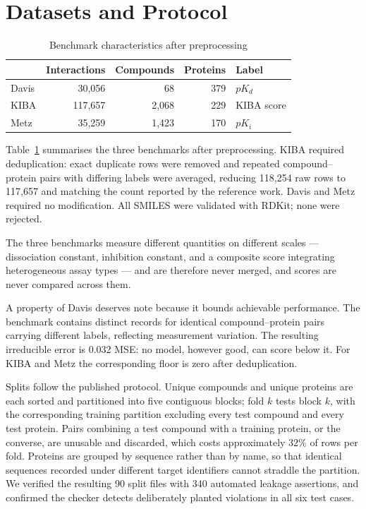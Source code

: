 \documentclass[conference]{IEEEtran}
\begin{document}
\section{Datasets and Protocol}

\begin{table}[t]
\caption{Benchmark characteristics after preprocessing}
\label{tab:data}
\centering
\small
\begin{tabular}{lrrrl}
\toprule
 & Interactions & Compounds & Proteins & Label \\
\midrule
Davis & 30{,}056 & 68 & 379 & $pK_d$ \\
KIBA  & 117{,}657 & 2{,}068 & 229 & KIBA score \\
Metz  & 35{,}259 & 1{,}423 & 170 & $pK_i$ \\
\bottomrule
\end{tabular}
\end{table}

Table~\ref{tab:data} summarises the three benchmarks after preprocessing. KIBA required
deduplication: exact duplicate rows were removed and repeated compound--protein pairs with
differing labels were averaged, reducing 118{,}254 raw rows to 117{,}657 and matching the count
reported by the reference work. Davis and Metz required no modification. All SMILES were validated
with RDKit; none were rejected.

The three benchmarks measure different quantities on different scales --- dissociation constant,
inhibition constant, and a composite score integrating heterogeneous assay types --- and are
therefore never merged, and scores are never compared across them.

A property of Davis deserves note because it bounds achievable performance. The benchmark contains
distinct records for identical compound--protein pairs carrying different labels, reflecting
measurement variation. The resulting irreducible error is 0.032 MSE: no model, however good, can
score below it. For KIBA and Metz the corresponding floor is zero after deduplication.

Splits follow the published protocol. Unique compounds and unique proteins are each sorted and
partitioned into five contiguous blocks; fold $k$ tests block $k$, with the corresponding training
partition excluding every test compound and every test protein. Pairs combining a test compound
with a training protein, or the converse, are unusable and discarded, which costs approximately
32\% of rows per fold. Proteins are grouped by sequence rather than by name, so that identical
sequences recorded under different target identifiers cannot straddle the partition. We verified
the resulting 90 split files with 340 automated leakage assertions, and confirmed the checker
detects deliberately planted violations in all six test cases.
\end{document}
